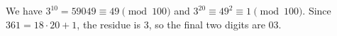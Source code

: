 We have $ 3^{10}=59049\equiv49\pmod{100}$ and $ 3^{20}\equiv49^2\equiv1\pmod{100}$. Since $ 361=18\cdot20+1 $, the residue is 3, so the final two digits are $\boxed{03}$.
